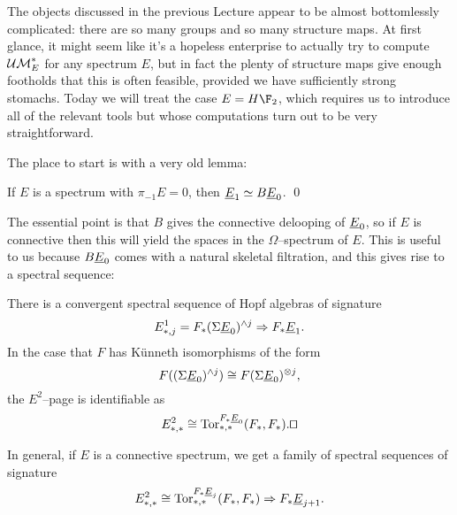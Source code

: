 The objects discussed in the previous Lecture appear to be almost bottomlessly complicated: there are so many groups and so many structure maps.  At first glance, it might seem like it's a hopeless enterprise to actually try to compute $\mathcal{UM}_{E}^*$ for any spectrum $E$, but in fact the plenty of structure maps give enough footholds that this is often feasible, provided we have sufficiently strong stomachs.  Today we will treat the case $E = H\F_2$, which requires us to introduce all of the relevant tools but whose computations turn out to be very straightforward.

The place to start is with a very old lemma:
\begin{lemma}
If $E$ is a spectrum with $\pi_{-1} E = 0$, then $\underline{\smash{E}}_{1} \simeq B\underline{\smash{E}}_{0}$. \qed
\end{lemma}
\noindent The essential point is that $B$ gives the connective delooping of $\underline{\smash{E}}_{0}$, so if $E$ is connective then this will yield the spaces in the $\Omega$--spectrum of $E$.  This is useful to us because $B\underline{\smash{E}}_{0}$ comes with a natural skeletal filtration, and this gives rise to a spectral sequence:
\begin{corollary}
There is a convergent spectral sequence of Hopf algebras of signature \[E^1_{*, j} = F_*(\Sigma \underline{\smash{E}}_{0})^{\wedge j} \Rightarrow F_* \underline{\smash{E}}_{1}.\]   In the case that $F$ has K\"unneth isomorphisms of the form \[F((\Sigma \underline{\smash{E}}_{0})^{\wedge j}) \cong F(\Sigma \underline{\smash{E}}_{0})^{\otimes j},\] the $E^2$--page is identifiable as \[E^2_{*, *} \cong \Tor^{F_* \OS{E}{0}}_{*, *}(F_*, F_*). \qed\]
\end{corollary}
\noindent In general, if $E$ is a connective spectrum, we get a family of spectral sequences of signature \[E^2_{*, *} \cong \operatorname{Tor}^{F_* \underline{\smash{E}}_{j}}_{*, *}(F_*, F_*) \Rightarrow F_* \underline{\smash{E}}_{j+1}.\]

